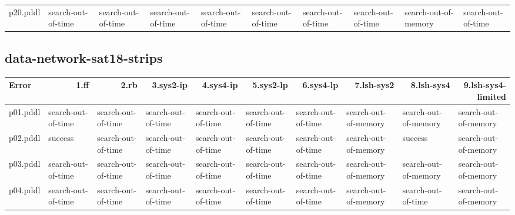 \documentclass{article}
\begin{document}
\begin{tabular}{@{}lrrrrrrrrr@{}}
p20.pddl & \multicolumn{1}{|l|}{search-out-of-time} & \multicolumn{1}{|l|}{search-out-of-time} & \multicolumn{1}{|l|}{search-out-of-time} & \multicolumn{1}{|l|}{search-out-of-time} & \multicolumn{1}{|l|}{search-out-of-time} & \multicolumn{1}{|l|}{search-out-of-time} & \multicolumn{1}{|l|}{search-out-of-time} & \multicolumn{1}{|l|}{search-out-of-memory} & \multicolumn{1}{|l|}{search-out-of-time} \\
\end{tabular}

\hypertarget{error-data-network-sat18-strips}{}
\subsection*{data-network-sat18-strips}

\begin{tabular}{@{}lrrrrrrrrr@{}}
Error & 1.ff & 2.rb & 3.sys2-ip & 4.sys4-ip & 5.sys2-lp & 6.sys4-lp & 7.lsh-sys2 & 8.lsh-sys4 & 9.lsh-sys4-limited \\
\midrule
p01.pddl & \multicolumn{1}{|l|}{search-out-of-time} & \multicolumn{1}{|l|}{search-out-of-time} & \multicolumn{1}{|l|}{search-out-of-time} & \multicolumn{1}{|l|}{search-out-of-time} & \multicolumn{1}{|l|}{search-out-of-time} & \multicolumn{1}{|l|}{search-out-of-time} & \multicolumn{1}{|l|}{search-out-of-memory} & \multicolumn{1}{|l|}{search-out-of-memory} & \multicolumn{1}{|l|}{search-out-of-memory} \\
p02.pddl & \multicolumn{1}{|l|}{success} & \multicolumn{1}{|l|}{search-out-of-time} & \multicolumn{1}{|l|}{search-out-of-time} & \multicolumn{1}{|l|}{search-out-of-time} & \multicolumn{1}{|l|}{search-out-of-time} & \multicolumn{1}{|l|}{search-out-of-time} & \multicolumn{1}{|l|}{search-out-of-memory} & \multicolumn{1}{|l|}{success} & \multicolumn{1}{|l|}{search-out-of-memory} \\
p03.pddl & \multicolumn{1}{|l|}{search-out-of-time} & \multicolumn{1}{|l|}{search-out-of-time} & \multicolumn{1}{|l|}{search-out-of-time} & \multicolumn{1}{|l|}{search-out-of-time} & \multicolumn{1}{|l|}{search-out-of-time} & \multicolumn{1}{|l|}{search-out-of-time} & \multicolumn{1}{|l|}{search-out-of-memory} & \multicolumn{1}{|l|}{search-out-of-memory} & \multicolumn{1}{|l|}{search-out-of-memory} \\
p04.pddl & \multicolumn{1}{|l|}{search-out-of-time} & \multicolumn{1}{|l|}{search-out-of-time} & \multicolumn{1}{|l|}{search-out-of-time} & \multicolumn{1}{|l|}{search-out-of-time} & \multicolumn{1}{|l|}{search-out-of-time} & \multicolumn{1}{|l|}{search-out-of-time} & \multicolumn{1}{|l|}{search-out-of-memory} & \multicolumn{1}{|l|}{search-out-of-time} & \multicolumn{1}{|l|}{search-out-of-memory} \\

\end{tabular}
\end{document}

